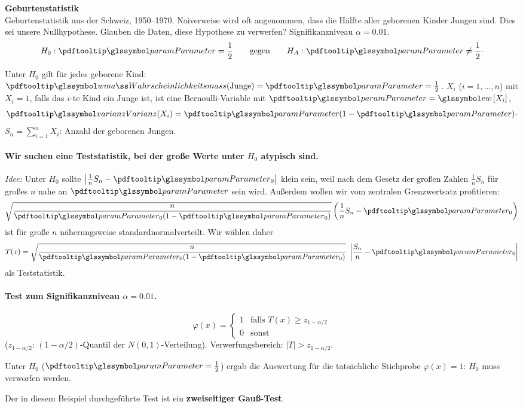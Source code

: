 \begin{bsp}
    \textbf{Geburtenstatistik}  \\
    Geburtenstatistik aus der Schweiz, 1950--1970.
    Naiverweise wird oft angenommen, dass die Hälfte aller
    geborenen Kinder Jungen sind.
    Dies sei unsere Nullhypothese.
    Glauben die Daten, diese Hypothese zu verwerfen?
    Signifikanzniveau $\alpha=0.01$.
    \[
        H_0 : \param = \frac12 \qquad \text{gegen} \qquad H_A : \param \ne \frac12 \cdot
    \]

    Unter $H_0$ gilt für jedes geborene Kind: $\pe(\text{Junge}) = \param = \frac12$. $X_i$ ($i=1,\dots,n$) mit
    $X_i=1$, falls das $i$-te Kind ein Junge ist, ist eine Bernoulli-Variable mit $\param = \E{X_i}$,
    \[
        \Var(X_i) = \param(1-\param) \cdot
    \]
    $S_n = \sum_{i=1}^n X_i$: Anzahl der geborenen Jungen.

    \paragraph{Wir suchen eine Teststatistik, bei der große Werte unter $H_0$ atypisch sind.}

    \textit{Idee:} Unter $H_0$ sollte $\left|\frac1n S_n - \param_0\right|$ klein sein, weil nach dem Gesetz der
    großen Zahlen $\frac1n S_n$ für großes $n$ nahe an $\param$ sein wird.
    Außerdem wollen wir vom zentralen
    Grenzwertsatz profitieren:
    \[
        \sqrt{\frac{n}{\param_0(1-\param_0)}} \left( \frac1n S_n - \param_0 \right)
    \]
    ist für große $n$ näherungsweise standardnormalverteilt.
    Wir wählen daher
    \[
        T(x) = \sqrt{\frac{n}{\param_0(1-\param_0)}}\ \left| \frac{S_n}{n} - \param_0 \right|
    \]
    als Teststatistik.

    \paragraph{Test zum Signifikanzniveau $\alpha=0.01$.}
    \[
        \varphi(x) = \begin{cases}
                         1 & \text{falls } T(x) \geq z_{1-\alpha/2} \\
                         0 & \text{sonst}
        \end{cases}
    \]
    ($z_{1-\alpha/2}$: $(1-\alpha/2)$-Quantil der $N(0,1)$-Verteilung).
    Verwerfungsbereich: $|T| > z_{1-\alpha/2}$.

    Unter $H_0$ ($\param=\frac12$) ergab die Auswertung für die tatsächliche Stichprobe $\varphi(x)=1$: $H_0$
    muss verworfen werden.

    Der in diesem Beispiel durchgeführte Test ist ein \textbf{zweiseitiger Gauß-Test}.
\end{bsp}

